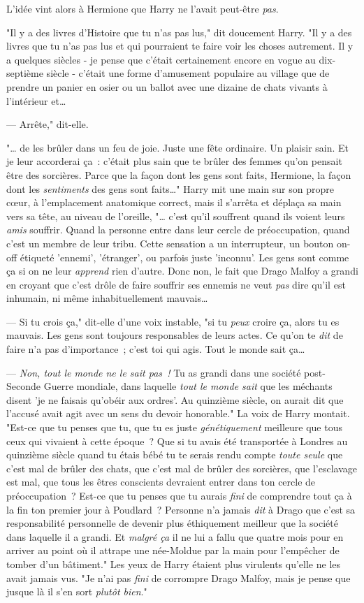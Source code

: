 L'idée vint alors à Hermione que Harry ne l'avait peut-être \emph{pas}.

"Il y a des livres d'Histoire que tu n'as pas lus," dit doucement Harry. "Il y a des livres que tu n'as pas lus et qui pourraient te faire voir les choses autrement. Il y a quelques siècles - je pense que c'était certainement encore en vogue au dix-septième siècle - c'était une forme d'amusement populaire au village que de prendre un panier en osier ou un ballot avec une dizaine de chats vivants à l'intérieur et…

--- Arrête," dit-elle.

"… de les brûler dans un feu de joie. Juste une fête ordinaire. Un plaisir sain. Et je leur accorderai ça~: c'était plus sain que te brûler des femmes qu'on pensait être des sorcières. Parce que la façon dont les gens sont faits, Hermione, la façon dont les \emph{sentiments} des gens sont faits…" Harry mit une main sur son propre cœur, à l'emplacement anatomique correct, mais il s'arrêta et déplaça sa main vers sa tête, au niveau de l'oreille, "… c'est qu'il souffrent quand ils voient leurs \emph{amis} souffrir. Quand la personne entre dans leur cercle de préoccupation, quand c'est un membre de leur tribu. Cette sensation a un interrupteur, un bouton on-off étiqueté 'ennemi', 'étranger', ou parfois juste 'inconnu'. Les gens sont comme ça si on ne leur \emph{apprend} rien d'autre. Donc non, le fait que Drago Malfoy a grandi en croyant que c'est drôle de faire souffrir ses ennemis ne veut \emph{pas} dire qu'il est inhumain, ni même inhabituellement mauvais…

--- Si tu crois ça," dit-elle d'une voix instable, "si tu \emph{peux} croire ça, alors tu es mauvais. Les gens sont toujours responsables de leurs actes. Ce qu'on te \emph{dit} de faire n'a pas d'importance~; c'est toi qui agis. Tout le monde sait ça…

--- \emph{Non, tout le monde ne le sait pas~!} Tu as grandi dans une société post-Seconde Guerre mondiale, dans laquelle \emph{tout le monde sait} que les méchants disent 'je ne faisais qu'obéir aux ordres'. Au quinzième siècle, on aurait dit que l'accusé avait agit avec un sens du devoir honorable." La voix de Harry montait. "Est-ce que tu penses que tu, que tu es juste \emph{génétiquement} meilleure que tous ceux qui vivaient à cette époque~? Que si tu avais été transportée à Londres au quinzième siècle quand tu étais bébé tu te serais rendu compte \emph{toute seule} que c'est mal de brûler des chats, que c'est mal de brûler des sorcières, que l'esclavage est mal, que tous les êtres conscients devraient entrer dans ton cercle de préoccupation~? Est-ce que tu penses que tu aurais \emph{fini} de comprendre tout ça à la fin ton premier jour à Poudlard~? Personne n'a jamais \emph{dit} à Drago que c'est sa responsabilité personnelle de devenir plus éthiquement meilleur que la société dans laquelle il a grandi. Et \emph{malgré ça} il ne lui a fallu que quatre mois pour en arriver au point où il attrape une née-Moldue par la main pour l'empêcher de tomber d'un bâtiment." Les yeux de Harry étaient plus virulents qu'elle ne les avait jamais vus. "Je n'ai pas \emph{fini} de corrompre Drago Malfoy, mais je pense que jusque là il s'en sort \emph{plutôt bien}."

